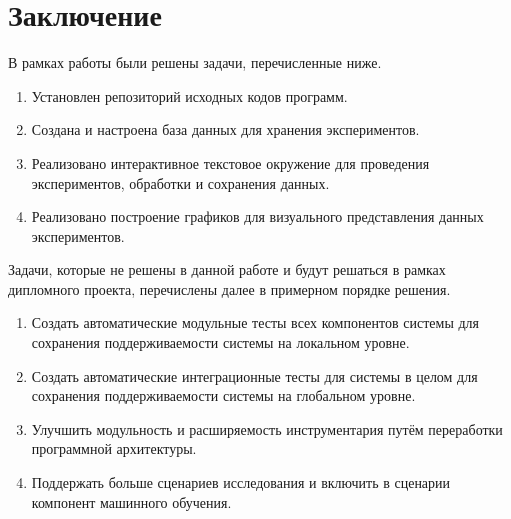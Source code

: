 \section{Заключение}
В рамках работы были решены задачи, перечисленные ниже.
\begin{enumerate}
    \item Установлен репозиторий исходных кодов программ.
    \item Создана и настроена база данных для хранения экспериментов.
    \item Реализовано интерактивное текстовое окружение для проведения экспериментов, обработки и сохранения данных.
    \item Реализовано построение графиков для визуального представления данных экспериментов.
\end{enumerate}

Задачи, которые не решены в данной работе и будут решаться в рамках дипломного проекта, перечислены далее в примерном порядке решения.
\begin{enumerate}
    \item Создать автоматические модульные тесты всех компонентов системы для сохранения поддерживаемости системы на локальном уровне.
    \item Создать автоматические интеграционные тесты для системы в целом для сохранения поддерживаемости системы на глобальном уровне.
    \item Улучшить модульность и расширяемость инструментария путём переработки программной архитектуры.
    \item Поддержать больше сценариев исследования и включить в сценарии компонент машинного обучения.
\end{enumerate}